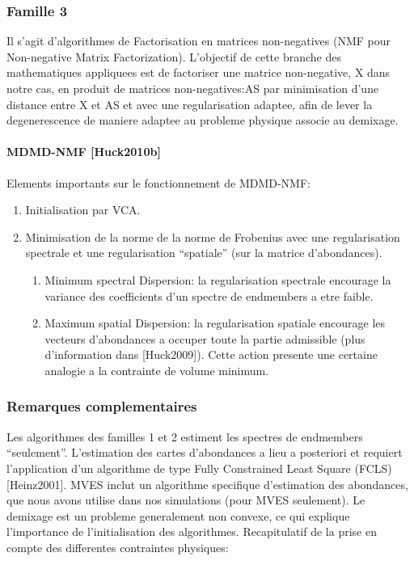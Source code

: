 \subsubsection{Famille 3}
Il s'agit d'algorithmes de Factorisation en matrices non-negatives
(NMF pour Non-negative Matrix Factorization). L'objectif de cette
branche des mathematiques appliquees est de factoriser une matrice
non-negative, X dans notre cas, en produit de matrices
non-negatives:AS par minimisation d'une distance entre X et AS et
avec une regularisation adaptee, afin de lever la degenerescence de
maniere adaptee au probleme physique associe au demixage.
\paragraph{MDMD-NMF [Huck2010b]} 
Elements importants sur le fonctionnement de MDMD-NMF:
\begin{enumerate}
\item {Initialisation par VCA.}
\item {Minimisation de la norme de la norme de
Frobenius avec une regularisation spectrale et une regularisation
``spatiale'' (sur la matrice d'abondances).}
\begin{enumerate}
\item {Minimum spectral
Dispersion: la regularisation spectrale encourage la variance des
coefficients d'un spectre de endmembers a etre faible.}
\item {Maximum spatial Dispersion: la regularisation spatiale
  encourage les vecteurs d'abondances a occuper toute la partie
  admissible (plus d'information dans [Huck2009]). Cette action
  presente une certaine analogie a la contrainte de volume minimum.}
\end{enumerate}
\end{enumerate}
 
 
  

\subsubsection{Remarques complementaires}
Les algorithmes des familles 1 et 2 estiment les spectres de
endmembers ``seulement''. L'estimation des cartes d'abondances a lieu
a posteriori et requiert l'application d'un algorithme de type Fully
Constrained Least Square (FCLS) [Heinz2001]. MVES inclut un algorithme
specifique d'estimation des abondances, que nous avons utilise dans
nos simulations (pour MVES seulement).  
Le demixage est un probleme generalement non convexe, ce
qui explique l'importance de l'initialisation des algorithmes.
Recapitulatif de la prise en compte des differentes contraintes
physiques:


